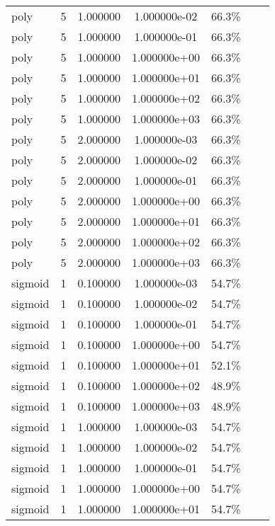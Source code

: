 \documentclass[11pt,spanish,listoffigures,listoftables]{tfgetsinf}
\begin{document}
\begin{table}
\begin{tabular}{l*{5}{c}r}
 poly & 5 & 1.000000 & 1.000000e-02 & 66.3\%\\
 poly & 5 & 1.000000 & 1.000000e-01 & 66.3\%\\
 poly & 5 & 1.000000 & 1.000000e+00 & 66.3\%\\
 poly & 5 & 1.000000 & 1.000000e+01 & 66.3\%\\
 poly & 5 & 1.000000 & 1.000000e+02 & 66.3\%\\
 poly & 5 & 1.000000 & 1.000000e+03 & 66.3\%\\
 poly & 5 & 2.000000 & 1.000000e-03 & 66.3\%\\
 poly & 5 & 2.000000 & 1.000000e-02 & 66.3\%\\
 poly & 5 & 2.000000 & 1.000000e-01 & 66.3\%\\
 poly & 5 & 2.000000 & 1.000000e+00 & 66.3\%\\
 poly & 5 & 2.000000 & 1.000000e+01 & 66.3\%\\
 poly & 5 & 2.000000 & 1.000000e+02 & 66.3\%\\
 poly & 5 & 2.000000 & 1.000000e+03 & 66.3\%\\
 sigmoid & 1 & 0.100000 & 1.000000e-03 & 54.7\%\\
 sigmoid & 1 & 0.100000 & 1.000000e-02 & 54.7\%\\
 sigmoid & 1 & 0.100000 & 1.000000e-01 & 54.7\%\\
 sigmoid & 1 & 0.100000 & 1.000000e+00 & 54.7\%\\
 sigmoid & 1 & 0.100000 & 1.000000e+01 & 52.1\%\\
 sigmoid & 1 & 0.100000 & 1.000000e+02 & 48.9\%\\
 sigmoid & 1 & 0.100000 & 1.000000e+03 & 48.9\%\\
 sigmoid & 1 & 1.000000 & 1.000000e-03 & 54.7\%\\
 sigmoid & 1 & 1.000000 & 1.000000e-02 & 54.7\%\\
 sigmoid & 1 & 1.000000 & 1.000000e-01 & 54.7\%\\
 sigmoid & 1 & 1.000000 & 1.000000e+00 & 54.7\%\\
 sigmoid & 1 & 1.000000 & 1.000000e+01 & 54.7\%\\
  \end{tabular} 
\end{table}
\end{document}
